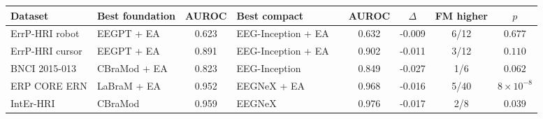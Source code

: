 \begin{tabular}{llcllcccc}
\toprule
Dataset & Best foundation & AUROC & Best compact & & AUROC & $\Delta$ & FM higher & $p$ \\
\midrule
ErrP-HRI robot & EEGPT + EA & 0.623 & EEG-Inception + EA & & 0.632 & -0.009 & 6/12 & $0.677$ \\
ErrP-HRI cursor & EEGPT + EA & 0.891 & EEG-Inception + EA & & 0.902 & -0.011 & 3/12 & $0.110$ \\
BNCI 2015-013 & CBraMod + EA & 0.823 & EEG-Inception & & 0.849 & -0.027 & 1/6 & $0.062$ \\
ERP CORE ERN & LaBraM + EA & 0.952 & EEGNeX + EA & & 0.968 & -0.016 & 5/40 & $8\times10^{-8}$ \\
IntEr-HRI & CBraMod & 0.959 & EEGNeX & & 0.976 & -0.017 & 2/8 & $0.039$ \\
\bottomrule
\end{tabular}

